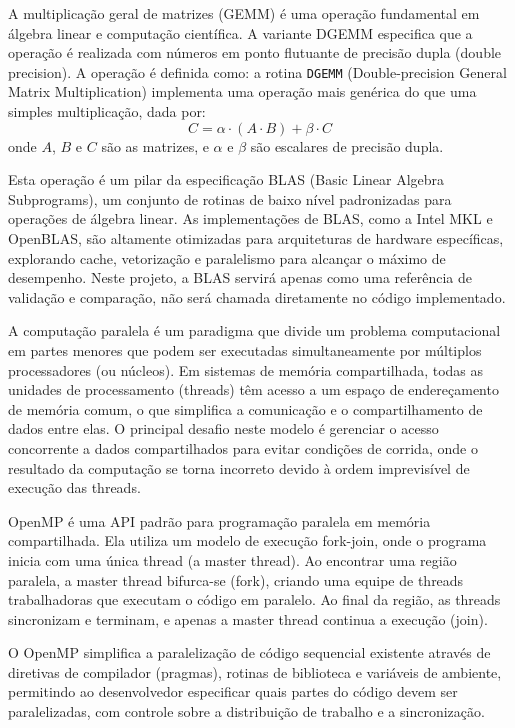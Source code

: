 \documentclass[12pt, a4paper]{article}
\begin{document}
	A multiplicação geral de matrizes (GEMM) é uma operação fundamental em álgebra
	linear e computação científica. A variante DGEMM especifica que a operação é realizada
	com números em ponto flutuante de precisão dupla (double precision). A
	operação é definida como: a rotina \texttt{DGEMM} (Double-precision General Matrix
	Multiplication) implementa uma operação mais genérica do que uma simples
	multiplicação, dada por:
	\[
		C = \alpha \cdot (A \cdot B) + \beta \cdot C
	\]
	onde $A$, $B$ e $C$ são as matrizes, e $\alpha$ e $\beta$ são escalares de precisão
	dupla.

	Esta operação é um pilar da especificação BLAS (Basic Linear Algebra
	Subprograms), um conjunto de rotinas de baixo nível padronizadas para
	operações de álgebra linear. As implementações de BLAS, como a Intel MKL e
	OpenBLAS, são altamente otimizadas para arquiteturas de hardware específicas,
	explorando cache, vetorização e paralelismo para alcançar o máximo de desempenho.
	Neste projeto, a BLAS servirá apenas como uma referência de validação e comparação,
	não será chamada diretamente no código implementado.

	A computação paralela é um paradigma que divide um problema computacional em partes
	menores que podem ser executadas simultaneamente por múltiplos processadores (ou
	núcleos). Em sistemas de memória compartilhada, todas as unidades de processamento
	(threads) têm acesso a um espaço de endereçamento de memória comum, o que
	simplifica a comunicação e o compartilhamento de dados entre elas. O principal
	desafio neste modelo é gerenciar o acesso concorrente a dados compartilhados para
	evitar condições de corrida, onde o resultado da computação se torna incorreto
	devido à ordem imprevisível de execução das threads.

	OpenMP é uma API padrão para programação paralela em memória compartilhada.
	Ela utiliza um modelo de execução fork-join, onde o programa inicia com uma única
	thread (a master thread). Ao encontrar uma região paralela, a master thread bifurca-se
	(fork), criando uma equipe de threads trabalhadoras que executam o código em
	paralelo. Ao final da região, as threads sincronizam e terminam, e apenas a master
	thread continua a execução (join).

	O OpenMP simplifica a paralelização de código sequencial existente através de diretivas
	de compilador (pragmas), rotinas de biblioteca e variáveis de ambiente, permitindo
	ao desenvolvedor especificar quais partes do código devem ser paralelizadas, com
	controle sobre a distribuição de trabalho e a sincronização.
\end{document}
